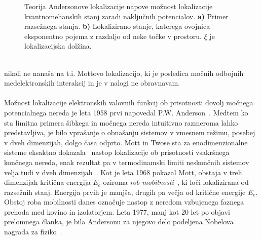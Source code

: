 \begin{minipage}[t]{0.42\textwidth}
\begin{figure}[H]
\caption{Teorija Andersonove lokalizacije napove možnost lokalizacije kvantnomehanskih stanj zaradi naključnih potencialov. \textbf{a)} Primer razsežnega stanja. \textbf{b)} Lokalizirano stanje, katerega ovojnica eksponentno pojema z razdaljo od neke točke v prostoru. $\xi$ je lokalizacijska dolžina. 
}
\label{fig:dif_loc_ext}
\end{figure}
\end{minipage}\\
nikoli ne nanaša na t.i. Mottovo lokalizacijo,
ki je posledica močnih odbojnih medelektronskih interakcij in je v nalogi ne obravnavam. \\\\
Možnost lokalizacije elektronskih valovnih funkcij ob prisotnosti dovolj močnega potencialnega nereda je leta 1958 prvi napovedal P.W. Anderson~\cite{anderson1958absence}. Medtem ko sta limitna primera šibkega in močnega nereda intuitivno razmeroma lahko predstavljiva, je bilo vprašanje o obnašanju sistemov v vmesnem režimu, posebej v dveh dimenzijah, dolgo časa odprto. Mott in Twose sta za enodimenzionalne sisteme eksaktno dokazala~\cite{doi:10.1080/00018736100101271} nastop lokalizacije ob prisotnosti vsakršnega končnega nereda, enak rezultat pa  v termodinamski limiti neskončnih sistemov velja tudi v dveh dimenzijah~\cite{abrahams1979scaling}. Kot je leta 1968 pokazal Mott, obstaja v treh dimenzijah kritična energija $E_c$ oziroma \emph{rob mobilnosti}~\cite{mott1990metal}, ki loči lokalizirana od razsežnih stanj. Energija prvih je manjša, drugih pa večja od kritične energije $E_c$. Obstoj roba mobilnosti danes označuje nastop z neredom vzbujenega faznega prehoda med kovino in izolatorjem. Leta 1977, manj kot 20 let po objavi prelomnega članka, je bila Andersonu za njegovo delo podeljena Nobelova nagrada za fiziko~\cite{anderson1978local}.
